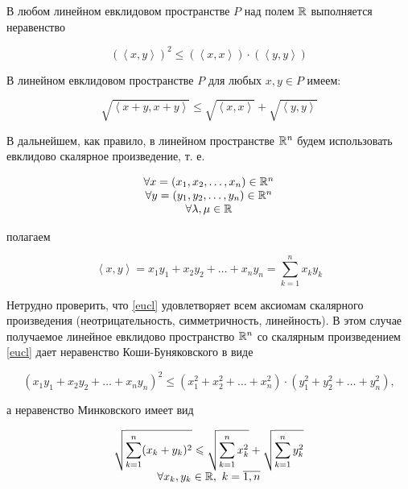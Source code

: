 \documentclass[../main.tex]{subfiles}
\begin{document}
\begin{thm}
 В любом линейном евклидовом пространстве $P$ над полем $\mathbb{R}$
 выполняется неравенство
 
 \begin{equation}
  \label{kosh-bun}
  (\left<x, y\right>)^2 \leq \left(\left<x, x\right>\right) 
  \cdot \left(\left<y, y\right>\right)
 \end{equation}
\end{thm}
\begin{crl*}
 В линейном евклидовом пространстве $P$ для любых $x, y \in P$ имеем:
 
 \begin{equation}
  \label{mink}
  \sqrt{\left<x+y, x+y\right>} \le
  \sqrt{\left<x, x\right>} + \sqrt{\left<y, y\right>}
 \end{equation}

\end{crl*}
\begin{rem}
 В дальнейшем, как правило, в линейном пространстве $\mathbb{R}^n$ будем 
 использовать евклидово скалярное произведение, т. е.

 \[
 \begin{array}{c}
  \forall x = (x_1, x_2, \dots, x_n) \in \mathbb{R}^n \\
  \forall y = (y_1, y_2, \dots, y_n) \in \mathbb{R}^n \\
  \forall \lambda, \mu \in \mathbb{R}
 \end{array}
 \]
 
 полагаем
 
 \begin{equation}
  \label{eucl}
  \left<x, y\right> = x_1y_1 + x_2y_2 + \dots + x_ny_n =
  \sum_{k=1}^n x_ky_k
 \end{equation}

 Нетрудно проверить, что \eqref{eucl} удовлетворяет всем аксиомам 
 скалярного произведения (неотрицательность, симметричность, 
 линейность). В этом случае получаемое линейное евклидово пространство
 $\mathbb{R}^n$ со скалярным произведением \eqref{eucl} дает неравенство
 Коши-Буняковского в виде
 
 \begin{equation}
  \label{kosh-bun.e}
  \left(x_1y_1 + x_2y_2 + \dots + x_ny_n\right)^2 \le
  \left(x_1^2 + x_2^2 + \dots + x_n^2\right)\cdot
  \left(y_1^2 + y_2^2 + \dots + y_n^2\right),
 \end{equation}
 
 а неравенство Минковского имеет вид
 
 \begin{equation}
  \label{mink.e}
  \begin{array}{c}
   \displaystyle
   \sqrt{\sum_{k=1}^n (x_k + y_k)^2} \leqslant
   \sqrt{\sum_{k=1}^n x_k^2} + \sqrt{\sum_{k=1}^n y_k^2} \\
   \forall x_k, y_k \in \mathbb{R},\ k = \overline{1, n}
  \end{array}
 \end{equation}
 
\end{rem}
\end{document}
